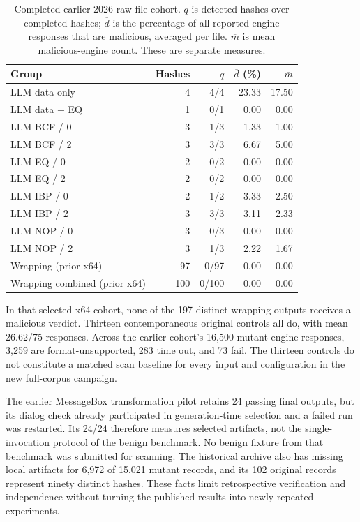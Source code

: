 \begin{table}[t]
\caption{Completed earlier 2026 raw-file cohort. $q$ is detected hashes
over completed hashes; $\overline d$ is the percentage of all reported
engine responses that are malicious, averaged per file. $\overline m$
is mean malicious-engine count. These are separate measures.}
\label{tab:new_vt_cohort}
\centering\small\setlength{\tabcolsep}{4pt}
\begin{tabular}{@{}lrrrr@{}}
\toprule
Group & Hashes & $q$ & $\overline d$ (\%) & $\overline m$ \\
\midrule
LLM data only & 4 & 4/4 & 23.33 & 17.50 \\
LLM data + EQ & 1 & 0/1 & 0.00 & 0.00 \\
LLM BCF / 0 & 3 & 1/3 & 1.33 & 1.00 \\
LLM BCF / 2 & 3 & 3/3 & 6.67 & 5.00 \\
LLM EQ / 0 & 2 & 0/2 & 0.00 & 0.00 \\
LLM EQ / 2 & 2 & 0/2 & 0.00 & 0.00 \\
LLM IBP / 0 & 2 & 1/2 & 3.33 & 2.50 \\
LLM IBP / 2 & 3 & 3/3 & 3.11 & 2.33 \\
LLM NOP / 0 & 3 & 0/3 & 0.00 & 0.00 \\
LLM NOP / 2 & 3 & 1/3 & 2.22 & 1.67 \\
Wrapping (prior x64) & 97 & 0/97 & 0.00 & 0.00 \\
Wrapping combined (prior x64) & 100 & 0/100 & 0.00 & 0.00 \\
\bottomrule
\end{tabular}
\end{table}


In that selected x64 cohort, none of the 197 distinct wrapping outputs
receives a malicious verdict. Thirteen contemporaneous original controls
all do, with mean 26.62/75 responses. Across the earlier cohort's 16,500
mutant-engine responses, 3,259 are format-unsupported, 283 time out, and
73 fail. The thirteen controls do not constitute a matched scan baseline
for every input and configuration in the new full-corpus campaign.

The earlier MessageBox transformation pilot retains 24 passing final
outputs, but its dialog check already participated in generation-time
selection and a failed run was restarted. Its 24/24 therefore measures
selected artifacts, not the single-invocation protocol of the benign
benchmark. No benign fixture from that benchmark was submitted for scanning.
The historical archive also has missing local artifacts for 6,972 of
15,021 mutant records, and its 102 original records represent ninety
distinct hashes. These facts limit retrospective verification and
independence without turning the published results into newly repeated
experiments.
